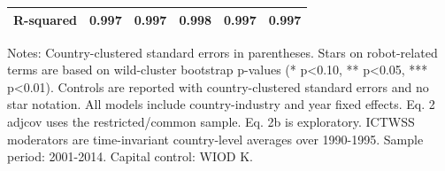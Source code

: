 \begin{table}[!htbp]
\begin{threeparttable}
\begin{tabular}{lccccc}
R-squared & 0.997 & 0.997 & 0.998 & 0.997 & 0.997 \\
\bottomrule
\end{tabular}
\begin{tablenotes}[flushleft]
\footnotesize
\item Notes: Country-clustered standard errors in parentheses. Stars on robot-related terms are based on wild-cluster bootstrap p-values (* p<0.10, ** p<0.05, *** p<0.01). Controls are reported with country-clustered standard errors and no star notation. All models include country-industry and year fixed effects. Eq. 2 adjcov uses the restricted/common sample. Eq. 2b is exploratory. ICTWSS moderators are time-invariant country-level averages over 1990-1995. Sample period: 2001-2014. Capital control: WIOD K.
\end{tablenotes}
\end{threeparttable}
\end{table}
